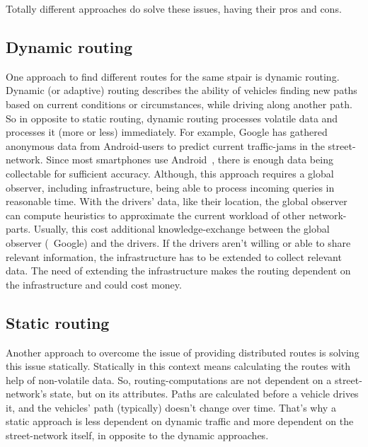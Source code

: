     Totally different approaches do solve these issues, having their pros and cons.

    \subsection{Dynamic routing}

        One approach to find different routes for the same \gls{stpair} is dynamic routing.
        Dynamic (or adaptive) routing describes the ability of vehicles finding new paths based on current conditions or circumstances, while driving along another path.
        So in opposite to static routing, dynamic routing processes volatile data and processes it (more or less) immediately.
        For example, Google has gathered~\cite{barth:google-traffic} anonymous data from Android-users to predict current traffic-jams in the street-network.
        Since most smartphones use Android~\cite{kantar:android-vs-ios}, there is enough data being collectable for sufficient accuracy.
        Although, this approach requires a global observer, including infrastructure, being able to process incoming queries in reasonable time.
        With the drivers' data, like their location, the global observer can compute heuristics to approximate the current workload of other network-parts.
        Usually, this cost additional knowledge-exchange between the global observer (\eg\ Google) and the drivers.
        If the drivers aren't willing or able to share relevant information, the infrastructure has to be extended to collect relevant data.
        The need of extending the infrastructure makes the routing dependent on the infrastructure and could cost money.

    \subsection{Static routing}

        Another approach to overcome the issue of providing distributed routes is solving this issue statically.
        Statically in this context means calculating the routes with help of non-volatile data.
        So, routing-computations are not dependent on a street-network's state, but on its attributes.
        Paths are calculated before a vehicle drives it, and the vehicles' path (typically) doesn't change over time.
        That's why a static approach is less dependent on dynamic traffic and more dependent on the street-network itself, in opposite to the dynamic approaches.

